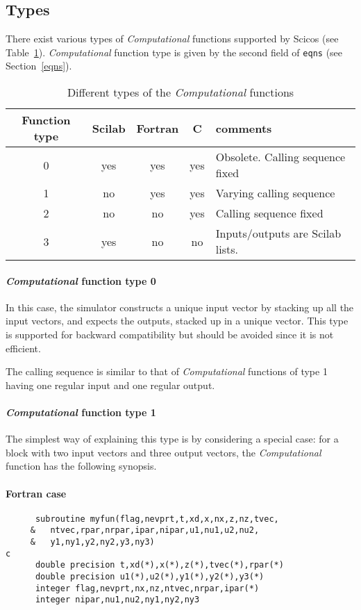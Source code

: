\documentclass{book}
\newcommand{\computational}{{\em Computational }}
\begin{document}
\subsection{Types}
There exist various types of \computational functions
supported by Scicos (see Table~\ref{tab1}). \computational function
type is given by the second field of {\tt eqns} (see
Section~\ref{eqns}). 

\begin{table}[ht]
\begin{center}
\begin{tabular}{|c|c|c|c|l|} \hline
Function type& Scilab & Fortran & C & comments \\ \hline
0 & yes & yes & yes & Obsolete. Calling sequence fixed \\
1 & no &  yes & yes & Varying calling sequence   \\
2 & no &  no  & yes & Calling sequence fixed  \\
3 & yes& no  &  no  & Inputs/outputs are Scilab lists.\\ \hline
\end{tabular}
\caption{Different types of the \computational functions}
\label{tab1}
\end{center}
\end{table}

\paragraph{\computational function type 0}
In this case, the simulator constructs a unique input vector by
stacking up all the input vectors, and expects the outputs, stacked up
in a unique vector. This type is supported for backward
compatibility but should be avoided since it is not efficient.

The calling sequence is similar to that of \computational functions of type 1
having one regular input and one regular output.

\paragraph{\computational function type 1}
The simplest way of explaining this type is by considering
a special case:
for a block with two input vectors and three output
vectors, the \computational function has the following synopsis.

\paragraph{Fortran case}
\begin{verbatim}
      subroutine myfun(flag,nevprt,t,xd,x,nx,z,nz,tvec,
     &   ntvec,rpar,nrpar,ipar,nipar,u1,nu1,u2,nu2,
     &   y1,ny1,y2,ny2,y3,ny3)
c
      double precision t,xd(*),x(*),z(*),tvec(*),rpar(*)
      double precision u1(*),u2(*),y1(*),y2(*),y3(*)
      integer flag,nevprt,nx,nz,ntvec,nrpar,ipar(*)
      integer nipar,nu1,nu2,ny1,ny2,ny3
\end{verbatim}
\end{document}
